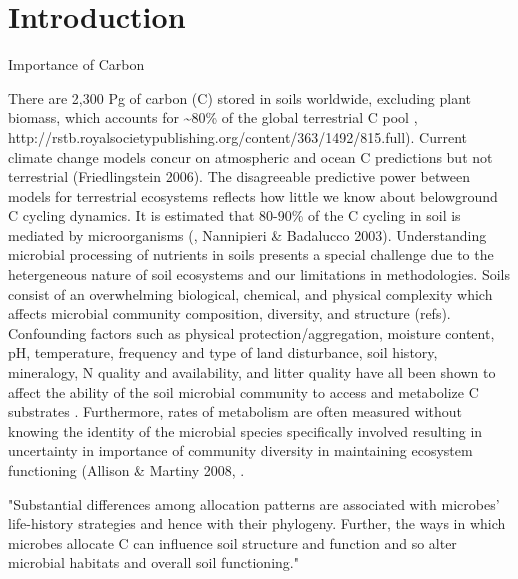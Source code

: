 \section{Introduction}

Importance of Carbon 

There are 2,300 Pg of carbon (C) stored in soils worldwide, excluding plant biomass, which accounts for \sim 80\% of the global terrestrial C pool \cite{Amundson_2001,IPCC 2000,IPCC 2007,elsen_Ayres_Wall_Bardgett_2011,Lal_2008,BATJES_1996}, http://rstb.royalsocietypublishing.org/content/363/1492/815.full).  Current climate change models concur on atmospheric and ocean C predictions but not terrestrial (Friedlingstein 2006).  The disagreeable predictive power between models for terrestrial ecosystems reflects how little we know about belowground C cycling dynamics. It is estimated that 80-90\% of the C cycling in soil is mediated by microorganisms (\cite{ColemanCrossley_1996}, Nannipieri & Badalucco 2003). Understanding microbial processing of nutrients in soils presents a special challenge due to the hetergeneous nature of soil ecosystems and our limitations in methodologies. Soils consist of an overwhelming biological, chemical, and physical complexity which affects microbial community composition, diversity, and structure (refs).  Confounding factors such as physical protection/aggregation, moisture content, pH, temperature, frequency and type of land disturbance, soil history, mineralogy, N quality and availability, and litter quality have all been shown to affect the ability of the soil microbial community to access and metabolize C substrates \cite{Schlesinger_1977,dgett_Wall_Hattenschwiler_2010,Sollins_Homann_Caldwell_1996,Torn_Vitousek_Trumbore_2005,TRUMBORE_2006}\cite{Schimel_2012}. Furthermore, rates of metabolism are often measured without knowing the identity of the microbial species specifically involved \cite{ndi_Pietramellara_Renella_2003} resulting in uncertainty in importance of community diversity in maintaining ecosystem functioning (Allison & Martiny 2008, \cite{ndi_Pietramellara_Renella_2003}. 

"Substantial differences among allocation patterns are associated with microbes’ life-history strategies and hence with their phylogeny. Further, the ways in which microbes allocate C can influence soil structure and function and so alter microbial habitats and overall soil functioning." \cite{Schimel_2012}

